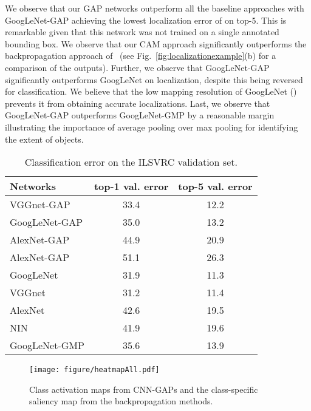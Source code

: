 \documentclass[10pt,twocolumn,letterpaper]{article}
\begin{document}
We observe that our GAP networks outperform all the baseline approaches with GoogLeNet-GAP achieving the lowest localization error of  on top-5. This is remarkable given that this network was not trained on a single annotated bounding box. We observe that our CAM approach significantly outperforms the backpropagation approach of~\cite{simonyan2013deep} (see Fig.~\ref{fig:localizationexample}(b) for a comparison of the outputs). Further, we observe that GoogLeNet-GAP significantly outperforms GoogLeNet on localization, despite this being reversed for classification. We believe that the low mapping resolution of GoogLeNet () prevents it from obtaining accurate localizations. Last, we observe that GoogLeNet-GAP outperforms GoogLeNet-GMP by a reasonable margin illustrating the importance of average pooling over max pooling for identifying the extent of objects.


















\begin{table}\caption{Classification error on the ILSVRC validation set.}
\label{network_classificationValidation}
\centering
\footnotesize
\begin{tabular}{ l | c | c }
  \hline  
  \hline                       
  Networks & top-1 val. error & top-5 val. error \\
    \hline   
VGGnet-GAP& 33.4 & 12.2 \\
GoogLeNet-GAP& 35.0 & 13.2 \\
AlexNet-GAP & 44.9 & 20.9 \\
AlexNet-GAP & 51.1 & 26.3 \\
\hline
  GoogLeNet & 31.9 & 11.3 \\ 
  VGGnet & 31.2 &  11.4 \\    
  AlexNet &  42.6 &  19.5  \\
    NIN & 41.9 & 19.6 \\
    \hline 
    GoogLeNet-GMP & 35.6 & 13.9 \\    
    \hline
\end{tabular}
\end{table}

\begin{figure*}
\begin{center}
\texttt{[image: figure/heatmapAll.pdf]}
\end{center}
\vspace{-4mm}
\caption{Class activation maps from CNN-GAPs and the class-specific saliency map from the backpropagation methods.}
\label{fig:activationmap}
\end{figure*}
\end{document}
